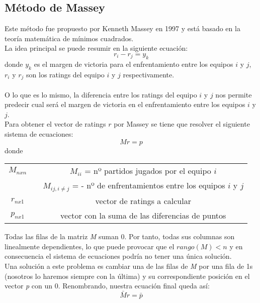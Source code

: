 \subsection{Método de Massey}
Este método fue propuesto por Kenneth Massey en 1997 y está basado en la teoría matemática de mínimos cuadrados.\\

La idea principal se puede resumir en la siguiente ecuación: 
\begin{equation}
	r_{i}-r_{j} = y_{k}
\end{equation}
donde $y_{k}$ es el margen de victoria para el enfrentamiento entre los equipos $i$ y $j$, $r_{i}$ y $r_{j}$ son los ratings del equipo $i$ y $j$ respectivamente.\\
\\
O lo que es lo mismo, la diferencia entre los ratings del equipo $i$ y $j$ nos permite predecir cual será el margen de victoria en el enfrentamiento entre los equipos $i$ y $j$.\\

Para obtener el vector de ratings $r$ por Massey se tiene que resolver el siguiente sistema de ecuaciones:
\begin{equation}
	Mr = p
\end{equation}
donde 
\begin{center}
	\begin{tabular}{ccc}
	\hline $M_{nxn}$ & & $M_{ii}$ = nº partidos jugados por el equipo $i$ \\
	& & $M_{ij, i \neq j}$ = - nº de enfrentamientos entre los equipos $i$ y $j$\\ 
	\hline  $r_{nx1}$ & & vector de ratings a calcular \\ 
	\hline  $p_{nx1}$ & & vector con la suma de las diferencias de puntos\\ 
	\hline 
\end{tabular}
\end{center} 

Todas las filas de la matriz \textit{M} suman 0. Por tanto, todas sus columnas son linealmente dependientes, lo que puede provocar que el $rango(M)<n$ y en consecuencia el sistema de ecuaciones podría no tener una única solución.\\

Una solución a este problema es cambiar una de las filas de \textit{M} por una fila de 1s (nosotros lo haremos siempre con la última) y su correspondiente posición en el vector \textit{p} con un 0.
Renombrando, nuestra ecuación final queda así:
\begin{equation}
	\bar{M}r = \bar{p}
\end{equation}

